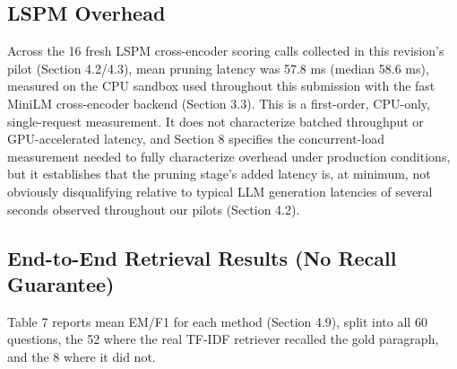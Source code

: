 \subsection{LSPM Overhead}
Across the 16 fresh LSPM cross-encoder scoring calls collected in this revision's pilot (Section 4.2/4.3), mean pruning latency was 57.8 ms (median 58.6 ms), measured on the CPU sandbox used throughout this submission with the fast MiniLM cross-encoder backend (Section 3.3). This is a first-order, CPU-only, single-request measurement. It does not characterize batched throughput or GPU-accelerated latency, and Section 8 specifies the concurrent-load measurement needed to fully characterize overhead under production conditions, but it establishes that the pruning stage's added latency is, at minimum, not obviously disqualifying relative to typical LLM generation latencies of several seconds observed throughout our pilots (Section 4.2).

\subsection{End-to-End Retrieval Results (No Recall Guarantee)}
Table 7 reports mean EM/F1 for each method (Section 4.9), split into all 60 questions, the 52 where the real TF-IDF retriever recalled the gold paragraph, and the 8 where it did not.

